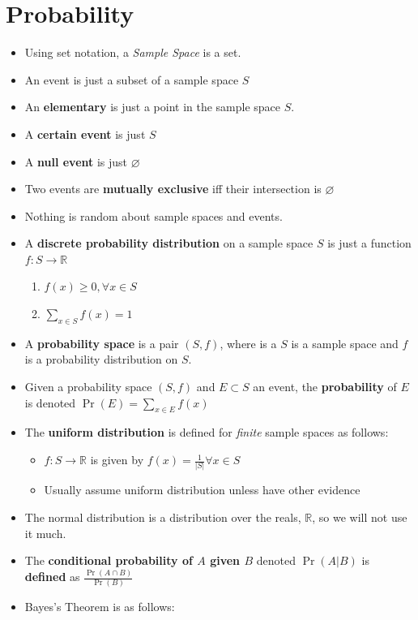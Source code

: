 \documentclass[12pt]{scrartcl}
\let\emptyset\varnothing{}
\begin{document}
\section{Probability}
\begin{itemize}
    \item Using set notation, a \textit{Sample Space} is a set.
    \item An event is just a subset of a sample space $S$
    \item An \textbf{elementary} is just a point in the sample space $S$.
    \item A \textbf{certain event} is just $S$
    \item A \textbf{null event} is just $\emptyset$
    \item Two events are \textbf{mutually exclusive} iff their intersection is $\emptyset$
    \item Nothing is random about sample spaces and events.
    \item A \textbf{discrete probability distribution} on a sample space $S$ is just a function $f : S \rightarrow \mathbb{R}$
        \begin{enumerate}
            \item $f(x) \geq 0, \forall x \in S$
            \item $\sum _{x \in S} f(x) = 1$
        \end{enumerate}

    \item A \textbf{probability space} is a pair $(S, f)$, where is a $S$ is a sample space and $f$ is a probability distribution on $S$.
    \item Given a probability space $(S, f)$ and $E \subset S$ an event, the \textbf{probability} of $E$ is denoted $\Pr(E) = \sum _{x \in E} f(x)$
    \item The \textbf{uniform distribution} is defined for \textit{finite} sample spaces as follows:
        \begin{itemize}
            \item $f : S \rightarrow \mathbb{R}$ is given by $f(x) = \frac{1}{|S|} \forall x \in S$
            \item Usually assume uniform distribution unless have other evidence
        \end{itemize}

    \item The normal distribution is a distribution over the reals, $\mathbb{R}$, so we will not use it much.
    \item The \textbf{conditional probability of $A$ given $B$} denoted $\Pr(A | B)$ is \textbf{defined} as $\frac{\Pr(A \cap B)}{\Pr(B)}$
    \item Bayes's Theorem is as follows:


\end{itemize}
\end{document}
